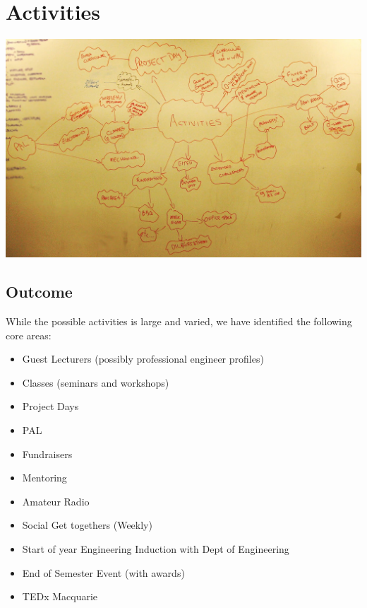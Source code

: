 \section{Activities}
\label{sec:Activities}
\includegraphics[angle=90, height=\textheight]{img/activities.jpg}
\subsection{Outcome}
While the possible activities is large and varied, we have identified the
following core areas:
\begin{itemize}
  \item Guest Lecturers (possibly professional engineer profiles)
  \item Classes (seminars and workshops)
  \item Project Days
  \item PAL
  \item Fundraisers
  \item Mentoring
  \item Amateur Radio
  \item Social Get togethers (Weekly)
  \item Start of year Engineering Induction with Dept of Engineering
  \item End of Semester Event (with awards)
  \item TEDx Macquarie
\end{itemize}

